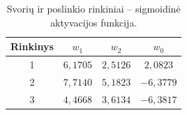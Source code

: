 \begin{table}[H]
    \centering
    \caption{Svorių ir poslinkio rinkiniai – sigmoidinė aktyvacijos funkcija.}
    \label{tab:sigmoid_weights}
    \begin{tabular}{|c|c|c|c|}
        \hline
        \textbf{Rinkinys} & $w_1$ & $w_2$ & $w_0$ \\
        \hline
        1 & $6{,}1705$ & $2{,}5126$ & $2{,}0823$ \\
        \hline
        2 & $7{,}7140$ & $5{,}1823$ & $-6{,}3779$ \\
        \hline
        3 & $4{,}4668$ & $3{,}6134$ & $-6{,}3817$ \\
        \hline
    \end{tabular}
\end{table}